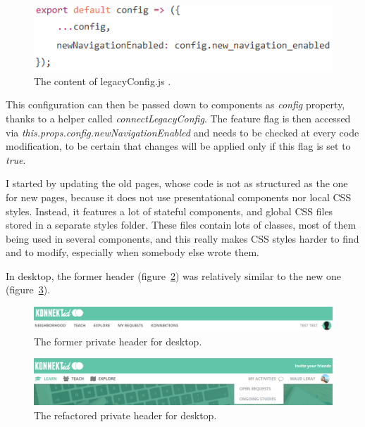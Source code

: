 \begin{figure}[H]
    \centering
    \includegraphics{figure/legacyConfig.png}
    \caption{The content of \guillemotleft{} legacyConfig.js \guillemotright{}.}
    \label{fig:legacyConfig}
\end{figure}

This configuration can then be passed down to components as \textit{config} property, thanks to a helper called \textit{connectLegacyConfig}. The feature flag is then accessed via \textit{this.props.config.newNavigationEnabled} and needs to be checked at every code modification, to be certain that changes will be applied only if this flag is set to \textit{true}.

I started by updating the old pages, whose code is not as structured as the one for new pages, because it does not use presentational components nor local CSS styles. Instead, it features a lot of stateful components, and global CSS files stored in a separate \guillemotleft{} styles \guillemotright{} folder. These files contain lots of classes, most of them being used in several components, and this really makes CSS styles harder to find and to modify, especially when somebody else wrote them.

In desktop, the former header ({\sc figure}~\ref{fig:oldNavDesktop}) was relatively similar to the new one ({\sc figure}~\ref{fig:newNavDesktop}). 

\begin{figure}[H]
    \centering
    \includegraphics[scale=0.3]{figure/oldNavDesktop.png}
    \caption{The former private header for desktop.}
    \label{fig:oldNavDesktop}
\end{figure}

\begin{figure}[H]
    \centering
    \includegraphics[scale=0.47]{figure/newNavDesktop.png}
    \caption{The refactored private header for desktop.}
    \label{fig:newNavDesktop}
\end{figure}

